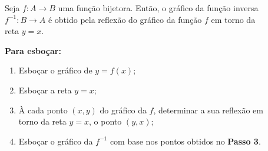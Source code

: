 \begin{frame}
  \begin{columns}[onlytextwidth]
    \begin{column}{0.49\textwidth}\vspace*{-0.55cm}
      \begin{theorem}
        Seja $f:A\rightarrow B$ uma função bijetora. Então, o gráfico da função inversa $f^{-1}:B\rightarrow A$ é obtido pela reflexão do gráfico da função $f$ em torno da reta $y=x$.
      \end{theorem}
      \begin{highlight}
        \textbf{Para esboçar:}
        \begin{enumerate}
          \item< 2- > Esboçar o gráfico de $y=f(x)$;
          \item< 3- > Esboçar a reta $y=x$;
          \item< 4- > À cada ponto $(x,y)$ do gráfico da $f$, determinar a sua reflexão em torno da reta $y=x$, o ponto $(y,x)$;
          \item< 5- > Esboçar o gráfico da $f^{-1}$ com base nos pontos obtidos no \textbf{Passo 3}.
        \end{enumerate}
      \end{highlight}
    \end{column}
    \begin{column}{0.49\textwidth}\vspace*{-0.55cm}
      \begin{figure}
      \end{figure}
    \end{column}
  \end{columns}
\end{frame}

